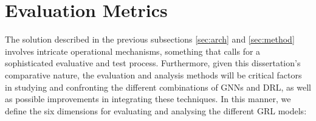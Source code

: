 \section{Evaluation Metrics} \label{sec:eval-methods}


The solution described in the previous subsections \ref{sec:arch} and \ref{sec:method} involves intricate operational mechanisms, something that calls for a sophisticated evaluative and test process. Furthermore, given this dissertation's comparative nature, the evaluation and analysis methods will be critical factors in studying and confronting the different combinations of \acp{GNN} and \ac{DRL}, as well as possible improvements in integrating these techniques. In this manner, we define the six dimensions for evaluating and analysing the different \ac{GRL} models:

